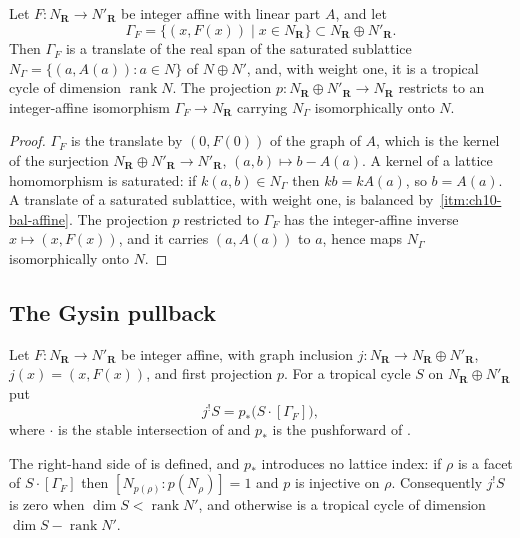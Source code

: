 \begin{proposition}
\label{prop:ch10-graph-cycle}
Let $F:N_{\mathbf R}\to N'_{\mathbf R}$ be integer affine with linear part
$A$, and let
\[
 \Gamma_F=\{(x,F(x))\mid x\in N_{\mathbf R}\}
 \subset N_{\mathbf R}\oplus N'_{\mathbf R}.
\]
Then $\Gamma_F$ is a translate of the real span of the saturated sublattice
$N_{\Gamma}=\{(a,A(a)):a\in N\}$ of $N\oplus N'$, and, with weight one, it is
a tropical cycle of dimension $\operatorname{rank}N$.  The projection
$p:N_{\mathbf R}\oplus N'_{\mathbf R}\to N_{\mathbf R}$ restricts to an
integer-affine isomorphism $\Gamma_F\to N_{\mathbf R}$ carrying $N_\Gamma$
isomorphically onto $N$.
\end{proposition}

\begin{proof}
$\Gamma_F$ is the translate by $(0,F(0))$ of the graph of $A$, which is the
kernel of the surjection $N_{\mathbf R}\oplus N'_{\mathbf R}\to
N'_{\mathbf R}$, $(a,b)\mapsto b-A(a)$.  A kernel of a lattice homomorphism
is saturated: if $k(a,b)\in N_\Gamma$ then $kb=kA(a)$, so $b=A(a)$.  A
translate of a saturated sublattice, with weight one, is balanced by
\,\cref{itm:ch10-bal-affine}.  The
projection $p$ restricted to $\Gamma_F$ has the integer-affine inverse
$x\mapsto(x,F(x))$, and it carries $(a,A(a))$ to $a$, hence maps $N_\Gamma$
isomorphically onto $N$.
\end{proof}

\subsection{The Gysin pullback}

\begin{definition}
\label{def:ch10-gysin}
Let $F:N_{\mathbf R}\to N'_{\mathbf R}$ be integer affine, with graph
inclusion $j:N_{\mathbf R}\to N_{\mathbf R}\oplus N'_{\mathbf R}$,
$j(x)=(x,F(x))$, and first projection $p$.  For a tropical cycle $S$ on
$N_{\mathbf R}\oplus N'_{\mathbf R}$ put
\[
 j^!S=p_*\bigl(S\cdot[\Gamma_F]\bigr),
\]
where $\cdot$ is the stable intersection of
 and $p_*$ is the pushforward of
.
\end{definition}

\begin{lemma}
\label{lem:ch10-gysin-defined}
The right-hand side of  is defined, and $p_*$ introduces
no lattice index: if $\rho$ is a facet of $S\cdot[\Gamma_F]$ then
$[N_{p(\rho)}:p(N_\rho)]=1$ and $p$ is injective on $\rho$.  Consequently
$j^!S$ is zero when $\dim S<\operatorname{rank}N'$, and otherwise is a
tropical cycle of dimension $\dim S-\operatorname{rank}N'$.
\end{lemma}

